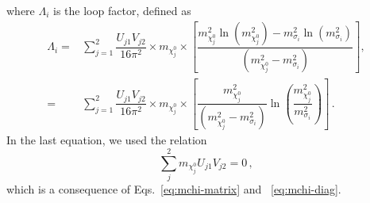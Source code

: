 \documentclass[12pt,letterpaper]{article}
\begin{document}
where $\Lambda_i$ is the loop factor, defined as
\begin{align}
\label{eq:Lambda}
\Lambda_i = & \sum_{j=1}^2
\dfrac{U_{j1}V_{j2}}{16\pi^2}
\times  m_{\chi_j^0} 
\times \left[\dfrac{m_{\chi_j^0}^2 \ln(m_{\chi_j^0}^2) - m_{\sigma_i}^2 \ln(m_{\sigma_i}^2 )}{\left(m_{\chi_j^0}^2-m_{\sigma_i}^2\right)}\right]\nonumber ,\\
= & \sum_{j=1}^2
\dfrac{U_{j1}V_{j2}}{16\pi^2}
\times  m_{\chi_j^0} 
\times \left[\dfrac{m_{\chi_j^0}^2}{\left(m_{\chi_j^0}^2-m_{\sigma_i}^2\right)}\ln{\left(\dfrac{m_{\chi_j^0}^2}{m_{\sigma_i}^2}\right)}\right]\,.
\end{align}
In the last equation, we used the relation 
\begin{equation}
\label{eq:sumcero}
\sum_{j}^2 m_{\chi_j^0} U_{j1}V_{j2}  = 0\,,
\end{equation}
which is a consequence of Eqs.~\eqref{eq:mchi-matrix} and ~\eqref{eq:mchi-diag}. 
\end{document}
